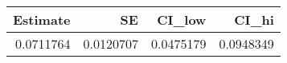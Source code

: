 \begin{table}

\caption{}
\centering
\begin{tabular}[t]{r|r|r|r}
\hline
Estimate & SE & CI\_low & CI\_hi\\
\hline
0.0711764 & 0.0120707 & 0.0475179 & 0.0948349\\
\hline
\end{tabular}
\end{table}
